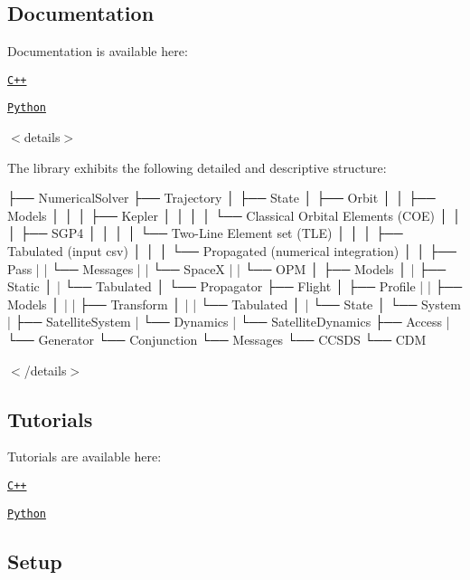 \subsection*{Documentation}

Documentation is available here\+:


\begin{DoxyItemize}
\item \href{https://open-space-collective.github.io/open-space-toolkit-astrodynamics}{\tt C++}
\item \href{./bindings/python/docs}{\tt Python}
\end{DoxyItemize}

$<$details$>$

The library exhibits the following detailed and descriptive structure\+:


\begin{DoxyCode}
├── NumericalSolver
├── Trajectory
│   ├── State
│   ├── Orbit
│   │   ├── Models
│   │   │   ├── Kepler
│   │   │   │   └── Classical Orbital Elements (COE)
│   │   │   ├── SGP4
│   │   │   │   └── Two-Line Element \textcolor{keyword}{set} (TLE)
│   │   │   ├── Tabulated (input csv)
│   │   │   └── Propagated (numerical integration)
│   │   ├── Pass
|   |   └── Messages
|   |       └── SpaceX
|   |           └── OPM
│   ├── Models
│   |   ├── Static
│   |   └── Tabulated
│   └── Propagator
├── Flight
│   ├── Profile
|   |    ├── Models
│   |    |   ├── Transform
│   |    |   └── Tabulated
│   |    └── State
│   └── System
|        ├── SatelliteSystem
|        └── Dynamics
|            └── SatelliteDynamics
├── Access
|   └── Generator
└── Conjunction
    └── Messages
        └── CCSDS
            └── CDM
\end{DoxyCode}


$<$/details$>$

\subsection*{Tutorials}

Tutorials are available here\+:


\begin{DoxyItemize}
\item \href{./tutorials/cpp}{\tt C++}
\item \href{./tutorials/python}{\tt Python}
\end{DoxyItemize}

\subsection*{Setup}

